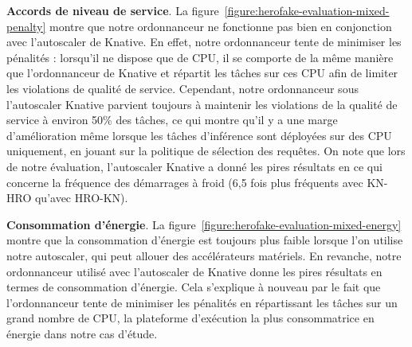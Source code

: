 \textbf{Accords de niveau de service}. La figure~\ref{figure:herofake-evaluation-mixed-penalty} montre que notre ordonnanceur ne fonctionne pas bien en conjonction avec l'autoscaler de Knative. En effet, notre ordonnanceur tente de minimiser les pénalités : lorsqu'il ne dispose que de CPU, il se comporte de la même manière que l'ordonnanceur de Knative et répartit les tâches sur ces CPU afin de limiter les violations de qualité de service. Cependant, notre ordonnanceur sous l'autoscaler Knative parvient toujours à maintenir les violations de la qualité de service à environ 50\% des tâches, ce qui montre qu'il y a une marge d'amélioration même lorsque les tâches d'inférence sont déployées sur des CPU uniquement, en jouant sur la politique de sélection des requêtes. On note que lors de notre évaluation, l'autoscaler Knative a donné les pires résultats en ce qui concerne la fréquence des démarrages à froid (6,5 fois plus fréquents avec KN-HRO qu'avec HRO-KN).

\textbf{Consommation d'énergie}. La figure~\ref{figure:herofake-evaluation-mixed-energy} montre que la consommation d'énergie est toujours plus faible lorsque l'on utilise notre autoscaler, qui peut allouer des accélérateurs matériels. En revanche, notre ordonnanceur utilisé avec l'autoscaler de Knative donne les pires résultats en termes de consommation d'énergie. Cela s'explique à nouveau par le fait que l'ordonnanceur tente de minimiser les pénalités en répartissant les tâches sur un grand nombre de CPU, la plateforme d'exécution la plus consommatrice en énergie dans notre cas d'étude.



